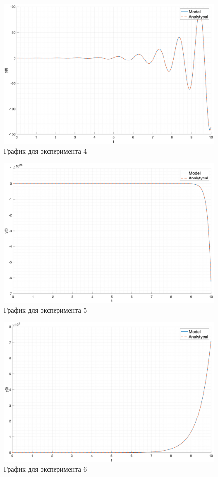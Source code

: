 \begin{figure}[ht!]
    \centering
    \includegraphics[width=\textwidth]{media/case4.png}
    \caption{График для эксперимента 4}
    \label{fig:case4}
\end{figure}

\begin{figure}[ht!]
    \centering
    \includegraphics[width=\textwidth]{media/case5.png}
    \caption{График для эксперимента 5}
    \label{fig:case5}
\end{figure}

\begin{figure}[ht!]
    \centering
    \includegraphics[width=\textwidth]{media/case6.png}
    \caption{График для эксперимента 6}
    \label{fig:case6}
\end{figure}

